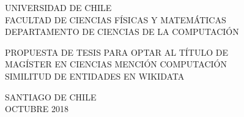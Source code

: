 \documentclass[a4paper,12pt]{article}
\begin{document}
\thispagestyle{empty}
\begin{center}

UNIVERSIDAD DE CHILE\\
FACULTAD DE CIENCIAS FÍSICAS Y MATEMÁTICAS\\
DEPARTAMENTO DE CIENCIAS DE LA COMPUTACIÓN\\

\vspace{5cm}

\MakeUppercase{Propuesta de tesis para optar al título de} \\
\MakeUppercase{Magíster en Ciencias mención Computación}\\
\vspace{2cm}
\MakeUppercase{Similitud de Entidades en WIKIDATA} \\




\vfill

SANTIAGO DE CHILE\\
OCTUBRE 2018 
\end{center}
\newpage




\end{document}
